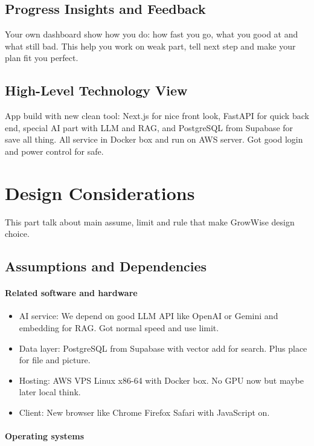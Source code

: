 \documentclass{FastFyp}
\begin{document}
\subsection{Progress Insights and Feedback}

Your own dashboard show how you do: how fast you go, what you good at and what still bad. This help you work on weak part, tell next step and make your plan fit you perfect.

\subsection{High-Level Technology View}

App build with new clean tool: Next.js for nice front look, FastAPI for quick back end, special AI part with LLM and RAG, and PostgreSQL from Supabase for save all thing. All service in Docker box and run on AWS server. Got good login and power control for safe.
\section{Design Considerations}

This part talk about main assume, limit and rule that make GrowWise design choice.

\subsection{Assumptions and Dependencies}

\paragraph{Related software and hardware}

\begin{itemize}
  \item AI service: We depend on good LLM API like OpenAI or Gemini and embedding for RAG. Got normal speed and use limit.
  \item Data layer: PostgreSQL from Supabase with vector add for search. Plus place for file and picture.
  \item Hosting: AWS VPS Linux x86-64 with Docker box. No GPU now but maybe later local think.
  \item Client: New browser like Chrome Firefox Safari with JavaScript on.
\end{itemize}

\paragraph{Operating systems}
\end{document}
